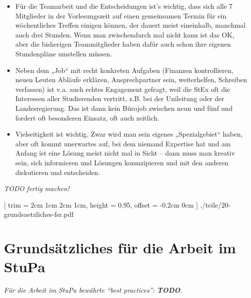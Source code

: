 \documentclass[
	10pt,
	a5paper,
	twoside
	]
	{book}
\begin{document}
\begin{itemize}
	\item Für die Teamarbeit und die Entscheidungen ist's wichtig, dass sich alle 7 Mitglieder in der Vorlesungszeit auf einen gemeinsamen Termin für ein wöchentliches Treffen einigen können, der dauert meist eineinhalb, manchmal auch drei Stunden. Wenn man zwischendurch mal nicht kann ist das OK, aber die bisherigen Teammitglieder haben dafür auch schon ihre eigenen Stundenpläne umstellen müssen.
	\item Neben dem „Job“ mit recht konkreten Aufgaben (Finanzen kontrollieren, neuen Leuten Abläufe erklären, Ansprechpartner sein, weiterhelfen, Schreiben verfassen) ist v.a. auch echtes Engagement gefragt, weil die StEx oft die Interessen aller Studierenden vertritt, z.B. bei der Unileitung oder der Landesregierung. Das ist dann kein Bürojob zwischen neun und fünf und fordert oft besonderen Einsatz, oft auch zeitlich.
	\item Vielseitigkeit ist wichtig. Zwar wird man sein eigenes „Spezialgebiet“ haben, aber oft kommt unerwartes auf, bei dem niemand Expertise hat und am Anfang ist eine Lösung meist nicht mal in Sicht – dann muss man kreativ sein, sich informieren und Lösungen konmzipieren und mit den anderen diskutieren und entscheiden.
\end{itemize}

\textit{TODO fertig machen!}



	[
		trim = 2cm 1cm 2cm 1cm,
		height = 0.95\paperheight,
		offset = -0.2cm 0cm
	]
	{./teile/20-grundsaetzliches-fsr.pdf}


\section*{Grundsätzliches für die Arbeit im StuPa}

\textit{Für die Arbeit im StuPa bewährte “best practices”: \textbf{TODO}.}

\clearpage
\end{document}
